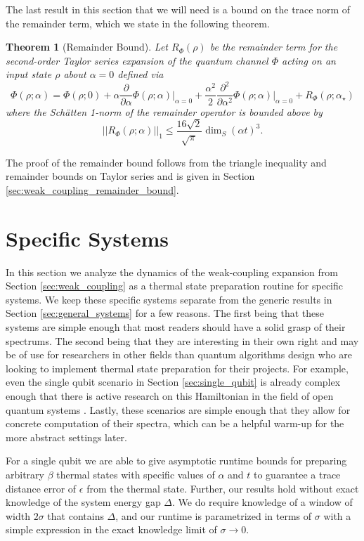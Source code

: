 \documentclass[
 amsmath,amssymb,
 aps,
onecolumn, 
nofootinbib]{revtex4-2}
\newtheorem{theorem}{Theorem}
\newcommand{\norm}[1]{\left|\left| #1 \right|\right|}
\begin{document}
The last result in this section that we will need is a bound on the trace norm of the remainder term, which we state in the following theorem.
\begin{theorem}[Remainder Bound] \label{thm:remainder_bound}
    Let $R_{\Phi}(\rho)$ be the remainder term for the second-order Taylor series expansion 
of the quantum channel $\Phi$ acting on an input state $\rho$ about $\alpha=0$ defined via
    $$\Phi(\rho; \alpha) = \Phi(\rho; 0) + \alpha \frac{\partial}{\partial \alpha} \Phi(\rho; \alpha) \big|_{\alpha = 0} + \frac{\alpha^2}{2} \frac{\partial^2}{\partial \alpha^2} \Phi(\rho; \alpha) \big|_{\alpha = 0} + R_{\Phi}(\rho; \alpha_{\star})$$ where the Sch\"{a}tten 1-norm of the remainder operator is bounded above by
    \begin{equation}
        \norm{R_{\Phi}(\rho;\alpha)}_1 \le \frac{16 \sqrt{2}}{\sqrt{\pi}} \dim_S (\alpha t)^3.
    \end{equation}
\end{theorem}
The proof of the remainder bound follows from the triangle inequality and remainder bounds on Taylor series and is given in Section \ref{sec:weak_coupling_remainder_bound}.



\section{Specific Systems} \label{sec:specific_systems}
In this section we analyze the dynamics of the weak-coupling expansion from Section \ref{sec:weak_coupling} as a thermal state preparation routine for specific systems. We keep these specific systems separate from the generic results in Section \ref{sec:general_systems} for a few reasons. The first being that these systems are simple enough that most readers should have a solid grasp of their spectrums. The second being that they are interesting in their own right and may be of use for researchers in other fields than quantum algorithms design who are looking to implement thermal state preparation for their projects. For example, even the single qubit scenario in Section \ref{sec:single_qubit} is already complex enough that there is active research on this Hamiltonian in the field of open quantum systems \cite{prositto2025equilibrium}. Lastly, these scenarios are simple enough that they allow for concrete computation of their spectra, which can be a helpful warm-up for the more abstract settings later.

For a single qubit we are able to give asymptotic runtime bounds for preparing arbitrary $\beta$ thermal states with specific values of $\alpha$ and $t$ to guarantee a trace distance error of $\epsilon$ from the thermal state. Further, our results hold without exact knowledge of the system energy gap $\Delta$. We do require knowledge of a window of width $2 \sigma$ that contains $\Delta$, and our runtime is parametrized in terms of $\sigma$ with a simple expression in the exact knowledge limit of $\sigma \to 0$.
\end{document}
